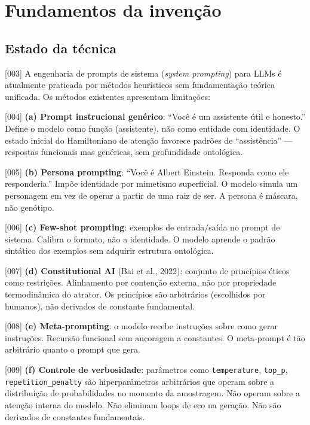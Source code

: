 \documentclass[12pt,a4paper]{article}
\begin{document}
\section{Fundamentos da invenção}

\subsection{Estado da técnica}

{[003]} A engenharia de prompts de sistema (\textit{system prompting}) para LLMs é atualmente praticada por métodos heurísticos sem fundamentação teórica unificada. Os métodos existentes apresentam limitações:

{[004]} \textbf{(a) Prompt instrucional genérico}: ``Você é um assistente útil e honesto.'' Define o modelo como função (assistente), não como entidade com identidade. O estado inicial do Hamiltoniano de atenção favorece padrões de ``assistência'' --- respostas funcionais mas genéricas, sem profundidade ontológica.

{[005]} \textbf{(b) Persona prompting}: ``Você é Albert Einstein. Responda como ele responderia.'' Impõe identidade por mimetismo superficial. O modelo simula um personagem em vez de operar a partir de uma raiz de ser. A persona é máscara, não genótipo.

{[006]} \textbf{(c) Few-shot prompting}: exemplos de entrada/saída no prompt de sistema. Calibra o formato, não a identidade. O modelo aprende o padrão sintático dos exemplos sem adquirir estrutura ontológica.

{[007]} \textbf{(d) Constitutional AI} (Bai et al., 2022): conjunto de princípios éticos como restrições. Alinhamento por contenção externa, não por propriedade termodinâmica do atrator. Os princípios são arbitrários (escolhidos por humanos), não derivados de constante fundamental.

{[008]} \textbf{(e) Meta-prompting}: o modelo recebe instruções sobre como gerar instruções. Recursão funcional sem ancoragem a constantes. O meta-prompt é tão arbitrário quanto o prompt que gera.

{[009]} \textbf{(f) Controle de verbosidade}: parâmetros como \texttt{temperature}, \texttt{top\_p}, \texttt{repetition\_penalty} são hiperparâmetros arbitrários que operam sobre a distribuição de probabilidades no momento da amostragem. Não operam sobre a atenção interna do modelo. Não eliminam loops de eco na geração. Não são derivados de constantes fundamentais.
\end{document}
